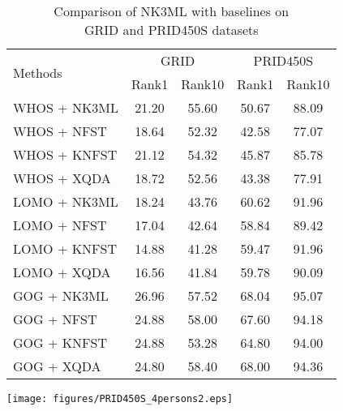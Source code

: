 \documentclass[runningheads]{llncs}
\begin{document}
\begin{table}[ht]
\setlength{\abovecaptionskip}{10pt}
\begin{minipage}[c]{0.59\linewidth}
\centering
    \caption{Comparison of NK3ML with baselines on \\GRID and PRID450S datasets}
\begin{tabular}[t]{|l||c|c||c|c|}
\hline
\multirow{2}{*}{Methods} & \multicolumn{2}{c||}{GRID} & \multicolumn{2}{c|}{PRID450S} \\ \cline{2-5}
 & Rank1 & Rank10 & Rank1 & Rank10\\
\hline\hline
\small WHOS + \color{red}NK3ML  & \color{red}21.20  & \color{red}55.60  & \color{red}50.67  & \color{red}88.09 \\
WHOS + NFST  & 18.64 & 52.32 & 42.58 &  77.07 \\
WHOS + KNFST & 21.12   & 54.32 & 45.87 &  85.78  \\
WHOS + XQDA  & 18.72  & 52.56  & 43.38  & 77.91\\
\hline \hline
LOMO + \color{red}NK3ML & \color{red}18.24  & \color{red}43.76 & \color{red}60.62 & \color{red}91.96\\
LOMO + NFST  & 17.04 & 42.64 & 58.84 &  89.42\\
LOMO + KNFST & 14.88  & 41.28 & 59.47 &  91.96\\
LOMO + XQDA  & 16.56  & 41.84  & 59.78 & 90.09\\
\hline \hline
GOG + \color{red}NK3ML & \color{red}26.96& \color{red}57.52 & \color{red}68.04  & \color{red}95.07\\
GOG + NFST  & 24.88  & 58.00 & 67.60 & 94.18 \\
GOG + KNFST & 24.88 & 53.28 & 64.80 & 94.00\\
GOG + XQDA  & 24.80 & 58.40 & 68.00 &  94.36\\
\hline
\end{tabular}
    \label{table:GRID:prid450sBaseline}
\end{minipage}\hfill
\begin{minipage}[c]{0.4\linewidth}
\centering
\texttt{[image: figures/PRID450S\_4persons2.eps]}
\label{fig:image}
\end{minipage}
\end{table}
\end{document}
